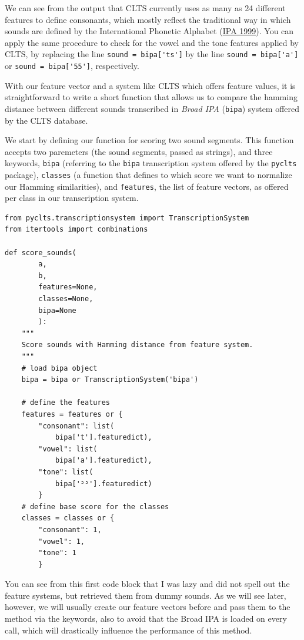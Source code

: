 \documentclass[
  a4paper,
  14pt,
  oneside,
  tablecaptionabove
]{scrbook}
\newcommand{\passthrough}[1]{#1}
\begin{document}
We can see from the output that CLTS currently uses as many as 24
different features to define consonants, which mostly reflect the
traditional way in which sounds are defined by the International
Phonetic Alphabet (\href{http://bibliography.lingpy.org?key=IPA1999}{IPA 1999}). You can
apply the same procedure to check for the vowel and the tone features
applied by CLTS, by replacing the line
\passthrough{\lstinline!sound = bipa['ts']!} by the line
\passthrough{\lstinline!sound = bipa['a']!} or
\passthrough{\lstinline!sound = bipa['55']!}, respectively.

With our feature vector and a system like CLTS which offers feature
values, it is straightforward to write a short function that allows us
to compare the hamming distance between different sounds transcribed in
\emph{Broad IPA} (\passthrough{\lstinline!bipa!}) system offered by
the CLTS database.

We start by defining our function for scoring two sound segments. This
function accepts two paremeters (the sound segments, passed as strings),
and three keywords, \passthrough{\lstinline!bipa!} (referring to the
\passthrough{\lstinline!bipa!} transcription system offered by the
\passthrough{\lstinline!pyclts!} package),
\passthrough{\lstinline!classes!} (a function that defines to which
score we want to normalize our Hamming similarities), and
\passthrough{\lstinline!features!}, the list of feature vectors, as
offered per class in our transcription system.

\begin{lstlisting}
from pyclts.transcriptionsystem import TranscriptionSystem
from itertools import combinations

def score_sounds(
        a,
        b,
        features=None,
        classes=None,
        bipa=None
        ):
    """
    Score sounds with Hamming distance from feature system.
    """
    # load bipa object
    bipa = bipa or TranscriptionSystem('bipa')

    # define the features
    features = features or {
        "consonant": list(
            bipa['t'].featuredict),
        "vowel": list(
            bipa['a'].featuredict),
        "tone": list(
            bipa['⁵⁵'].featuredict)
        }
    # define base score for the classes
    classes = classes or {
        "consonant": 1,
        "vowel": 1,
        "tone": 1
        }
\end{lstlisting}

You can see from this first code block that I was lazy and did not spell
out the feature systems, but retrieved them from dummy sounds. As we
will see later, however, we will usually create our feature vectors
before and pass them to the method via the keywords, also to avoid that
the Broad IPA is loaded on every call, which will drastically influence
the performance of this method.
\end{document}
